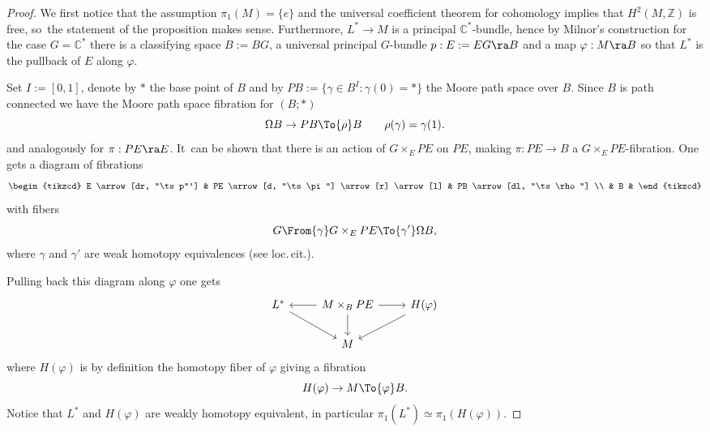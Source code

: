 \begin{proof}
We first notice that the assumption $\pi_1(M) = \{e\}$ and the universal coefficient theorem for cohomology implies that $H^2(M,\mathbb{Z})$ is free, so~the statement of the proposition makes sense. Furthermore, $L^* \to M$ is a principal $\mathbb{C}^*$-bundle, hence by Milnor's construction \cite{Milnor} for the case $G= \mathbb{C}^*$ there is a classifying space $B:= BG$, a universal principal $G$-bundle $p: E:= EG \ra B$ and a map $\varphi: M \ra B$ so that $L^*$ is the pullback of $E$ along $\varphi$.

Set $I :=[0,1]$, denote by $\ast$ the base point of $B$ and by $PB := \{ \gamma \in B^I : \gamma(0) = \ast\}$ the Moore path space over $B$. Since $B$ is path connected
we have the Moore path space fibration for $(B;*)$
\[
\Omega B \to PB \To{\rho} B \qquad \rho(\gamma) = \gamma(1).
\]
and analogously for $\pi: PE \ra E$. It~can be shown \cite[Prop.\,2.10]{FHT} that there is an action of $G \times_E PE$ on $PE$, making $ \pi:PE \to B$ a $G \times_E PE$-fibration. One gets a diagram of fibrations
\[
\begin{tikzcd}
E \arrow[dr, "\ts p"']
& PE \arrow[d, "\ts \pi"] \arrow[r] \arrow[l]
& PB \arrow[dl, "\ts \rho"] \\ 
& B &
\end{tikzcd}
\]
with fibers
\[
G\From{\gamma} G \times_E PE\To{\gamma'}\Omega B,
\]
where $\gamma$ and $\gamma'$ are weak homotopy equivalences (see loc.\,cit.).

Pulling back this diagram along $\varphi$ one gets
\[
\begin{tikzcd}
L^* \arrow[dr] & M \times_B PE \arrow[l] \arrow[r] \arrow[d] & H(\varphi) \arrow[dl] \\
& M &
\end{tikzcd}
\]
where $H(\varphi)$ is by definition the homotopy fiber of $\varphi$ giving a fibration
\[
H(\varphi) \to M \To{\varphi} B.
\]
Notice that $L^*$ and $H(\varphi)$ are weakly homotopy equivalent, in particular $\pi_1(L^*) \simeq \pi_1(H(\varphi))$.


\end{proof}
